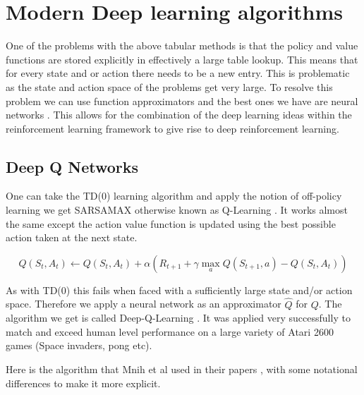 \section{Modern Deep learning algorithms}\label{sec:MDLA}

One of the problems with the above tabular methods is that the policy and value functions are stored explicitly in effectively a large table lookup. This means that for every state and or action there needs to be a new entry. This is problematic as the state and action space of the problems get very large. To resolve this problem we can use function approximators and the best ones we have are neural networks \cite{hornikMultilayerFeedforwardNetworks1989}. This allows for the combination of the deep learning ideas within the reinforcement learning framework to give rise to deep reinforcement learning.

\subsection{Deep Q Networks}
\label{subsec:DQN}

One can take the TD(0) learning algorithm and apply the notion of off-policy learning we get SARSAMAX otherwise known as Q-Learning \cite{watkinsLearningDelayedReward1989} \cite{watkinsQlearning1992} . It works almost the same except the action value function is updated using the best possible action taken at the next state.

\begin{equation}
Q(S_{t}, A_{t}) \leftarrow Q(S_{t}, A_{t}) + \alpha \left( R_{t+1}+\gamma \max_{a} Q(S_{t+1}, a) - Q(S_{t}, A_{t}) \right) 
\end{equation}

As with TD(0) this fails when faced with a sufficiently large state and/or action space. Therefore we apply a neural network as an approximator $\hat{Q}$ for $Q$. The algorithm we get is called Deep-Q-Learning \cite{mnihPlayingAtariDeep2013}\cite{mnihHumanlevelControlDeep2015}. It was applied very successfully to match and exceed human level performance on a large variety of Atari 2600 games (Space invaders, pong etc).

Here is the algorithm that Mnih et al used in their papers \cite{mnihPlayingAtariDeep2013} \cite{mnihHumanlevelControlDeep2015}, with some notational differences to make it more explicit.

